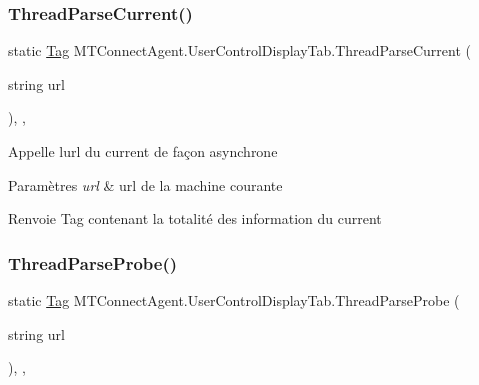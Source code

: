 \subsubsection{\texorpdfstring{Thread\+Parse\+Current()}{ThreadParseCurrent()}}
{\footnotesize\ttfamily static \mbox{\hyperlink{class_m_t_connect_agent_1_1_model_1_1_tag}{Tag}} M\+T\+Connect\+Agent.\+User\+Control\+Display\+Tab.\+Thread\+Parse\+Current (\begin{DoxyParamCaption}\item[{string}]{url }\end{DoxyParamCaption})\hspace{0.3cm}{\ttfamily [inline]}, {\ttfamily [static]}, {\ttfamily [private]}}



Appelle l\textquotesingle{}url du current de façon asynchrone 


\begin{DoxyParams}{Paramètres}
{\em url} & url de la machine courante\\
\hline
\end{DoxyParams}
\begin{DoxyReturn}{Renvoie}
Tag contenant la totalité des information du current
\end{DoxyReturn}
\mbox{\label{class_m_t_connect_agent_1_1_user_control_display_tab_ad1fd6a35a00d563b8515f464a3f60afc}} 
\subsubsection{\texorpdfstring{Thread\+Parse\+Probe()}{ThreadParseProbe()}}
{\footnotesize\ttfamily static \mbox{\hyperlink{class_m_t_connect_agent_1_1_model_1_1_tag}{Tag}} M\+T\+Connect\+Agent.\+User\+Control\+Display\+Tab.\+Thread\+Parse\+Probe (\begin{DoxyParamCaption}\item[{string}]{url }\end{DoxyParamCaption})\hspace{0.3cm}{\ttfamily [inline]}, {\ttfamily [static]}, {\ttfamily [private]}}



